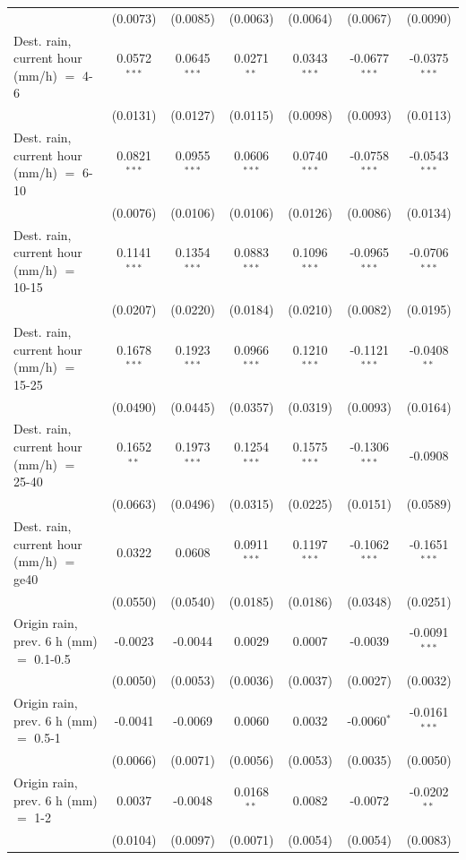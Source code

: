 \begin{tabular}{lcccccc}
    & (0.0073) & (0.0085) & (0.0063) & (0.0064) & (0.0067) & (0.0090)\\
   Dest. rain, current hour (mm/h) $=$ 4-6 & 0.0572$^{***}$ & 0.0645$^{***}$ & 0.0271$^{**}$ & 0.0343$^{***}$ & -0.0677$^{***}$ & -0.0375$^{***}$\\
    & (0.0131) & (0.0127) & (0.0115) & (0.0098) & (0.0093) & (0.0113)\\
   Dest. rain, current hour (mm/h) $=$ 6-10 & 0.0821$^{***}$ & 0.0955$^{***}$ & 0.0606$^{***}$ & 0.0740$^{***}$ & -0.0758$^{***}$ & -0.0543$^{***}$\\
    & (0.0076) & (0.0106) & (0.0106) & (0.0126) & (0.0086) & (0.0134)\\
   Dest. rain, current hour (mm/h) $=$ 10-15 & 0.1141$^{***}$ & 0.1354$^{***}$ & 0.0883$^{***}$ & 0.1096$^{***}$ & -0.0965$^{***}$ & -0.0706$^{***}$\\
    & (0.0207) & (0.0220) & (0.0184) & (0.0210) & (0.0082) & (0.0195)\\
   Dest. rain, current hour (mm/h) $=$ 15-25 & 0.1678$^{***}$ & 0.1923$^{***}$ & 0.0966$^{***}$ & 0.1210$^{***}$ & -0.1121$^{***}$ & -0.0408$^{**}$\\
    & (0.0490) & (0.0445) & (0.0357) & (0.0319) & (0.0093) & (0.0164)\\
   Dest. rain, current hour (mm/h) $=$ 25-40 & 0.1652$^{**}$ & 0.1973$^{***}$ & 0.1254$^{***}$ & 0.1575$^{***}$ & -0.1306$^{***}$ & -0.0908\\
    & (0.0663) & (0.0496) & (0.0315) & (0.0225) & (0.0151) & (0.0589)\\
   Dest. rain, current hour (mm/h) $=$ ge40 & 0.0322 & 0.0608 & 0.0911$^{***}$ & 0.1197$^{***}$ & -0.1062$^{***}$ & -0.1651$^{***}$\\
    & (0.0550) & (0.0540) & (0.0185) & (0.0186) & (0.0348) & (0.0251)\\
   Origin rain, prev. 6 h (mm) $=$ 0.1-0.5 & -0.0023 & -0.0044 & 0.0029 & 0.0007 & -0.0039 & -0.0091$^{***}$\\
    & (0.0050) & (0.0053) & (0.0036) & (0.0037) & (0.0027) & (0.0032)\\
   Origin rain, prev. 6 h (mm) $=$ 0.5-1 & -0.0041 & -0.0069 & 0.0060 & 0.0032 & -0.0060$^{*}$ & -0.0161$^{***}$\\
    & (0.0066) & (0.0071) & (0.0056) & (0.0053) & (0.0035) & (0.0050)\\
   Origin rain, prev. 6 h (mm) $=$ 1-2 & 0.0037 & -0.0048 & 0.0168$^{**}$ & 0.0082 & -0.0072 & -0.0202$^{**}$\\
    & (0.0104) & (0.0097) & (0.0071) & (0.0054) & (0.0054) & (0.0083)\\

\end{tabular}
